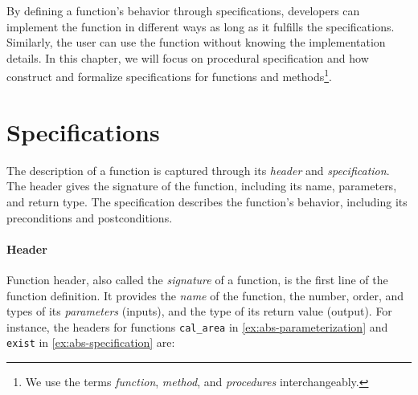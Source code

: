 \documentclass[oneside,11pt,dvipsnames]{book}
\newcommand{\code}[1]{\texttt{#1}}
\begin{document}
By defining a function's behavior through specifications, developers can implement the function in different ways as long as it fulfills the specifications. Similarly, the user can use the function without knowing the implementation details. In this chapter, we will focus on procedural specification and how construct and formalize specifications for functions and methods\footnote{We use the terms \emph{function}, \emph{method}, and \emph{procedures} interchangeably.}.

\section{Specifications}\label{sec:specifications}







The description of a function is captured through its \emph{header} and \emph{specification}.
The header gives the signature of the function, including its name, parameters, and return type. The specification describes the function's behavior, including its preconditions and postconditions.

\paragraph{Header} Function header, also called the \emph{signature} of a function, is the first line of the function definition. It provides the \emph{name} of the function, the number, order, and types of its \emph{parameters} (inputs), and the type of its return value (output). For instance, the headers for functions \code{cal\_area} in \autoref{ex:abs-parameterization} and \code{exist} in \autoref{ex:abs-specification} are: 
\end{document}
